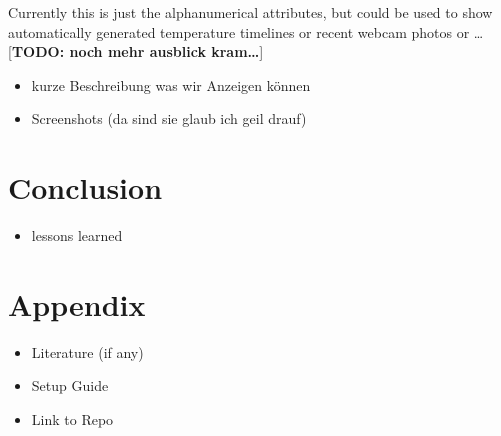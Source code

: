 Currently this is just the alphanumerical attributes, but could be used
to show automatically generated temperature timelines or recent webcam
photos or \ldots{} {[}\textbf{TODO: noch mehr ausblick kram\ldots{}}{]}

\begin{itemize}
\itemsep1pt\parskip0pt
\item
  kurze Beschreibung was wir Anzeigen können
\item
  Screenshots (da sind sie glaub ich geil drauf)
\end{itemize}

\section{Conclusion}\label{conclusion}

\begin{itemize}
\itemsep1pt\parskip0pt
\item
  lessons learned
\end{itemize}

\section{Appendix}\label{appendix}

\begin{itemize}
\itemsep1pt\parskip0pt
\item
  Literature (if any)
\item
  Setup Guide
\item
  Link to Repo
\end{itemize}
